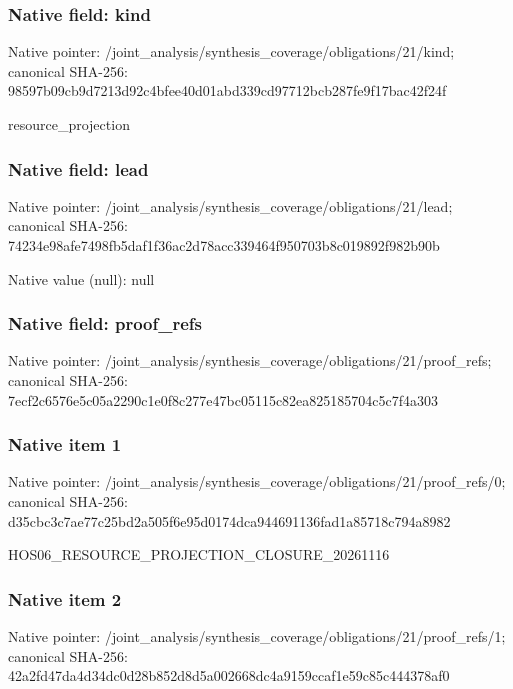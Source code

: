 \documentclass[10pt,a4paper]{article}
\begin{document}
\subsubsection{Native field: kind}
Native pointer: /joint\_\allowbreak{}analysis/synthesis\_\allowbreak{}coverage/obligations/21/kind; canonical SHA-256: 98597b09cb9d7213d92c4bfee40d01abd339cd97712bcb287fe9f17bac42f24f

\begingroup\raggedright\sloppy resource\_\allowbreak{}projection\par\endgroup

\subsubsection{Native field: lead}
Native pointer: /joint\_\allowbreak{}analysis/synthesis\_\allowbreak{}coverage/obligations/21/lead; canonical SHA-256: 74234e98afe7498fb5daf1f36ac2d78acc339464f950703b8c019892f982b90b

Native value (null): null

\subsubsection{Native field: proof\_\allowbreak{}refs}
Native pointer: /joint\_\allowbreak{}analysis/synthesis\_\allowbreak{}coverage/obligations/21/proof\_\allowbreak{}refs; canonical SHA-256: 7ecf2c6576e5c05a2290c1e0f8c277e47bc05115c82ea825185704c5c7f4a303

\subsubsection{Native item 1}
Native pointer: /joint\_\allowbreak{}analysis/synthesis\_\allowbreak{}coverage/obligations/21/proof\_\allowbreak{}refs/0; canonical SHA-256: d35cbc3c7ae77c25bd2a505f6e95d0174dca944691136fad1a85718c794a8982

\begingroup\raggedright\sloppy HOS06\_\allowbreak{}RESOURCE\_\allowbreak{}PROJECTION\_\allowbreak{}CLOSURE\_\allowbreak{}20261116\par\endgroup

\subsubsection{Native item 2}
Native pointer: /joint\_\allowbreak{}analysis/synthesis\_\allowbreak{}coverage/obligations/21/proof\_\allowbreak{}refs/1; canonical SHA-256: 42a2fd47da4d34dc0d28b852d8d5a002668dc4a9159ccaf1e59c85c444378af0
\end{document}
